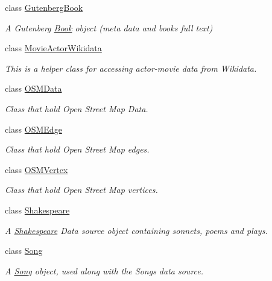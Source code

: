 \begin{DoxyCompactItemize}
class \hyperlink{classbridges_1_1dataset_1_1_gutenberg_book}{Gutenberg\+Book}
\begin{DoxyCompactList}\small\item\em A Gutenberg \hyperlink{classbridges_1_1dataset_1_1_book}{Book} object (meta data and book\textquotesingle{}s full text) \end{DoxyCompactList}\item 
class \hyperlink{classbridges_1_1dataset_1_1_movie_actor_wikidata}{Movie\+Actor\+Wikidata}
\begin{DoxyCompactList}\small\item\em This is a helper class for accessing actor-\/movie data from Wikidata. \end{DoxyCompactList}\item 
class \hyperlink{classbridges_1_1dataset_1_1_o_s_m_data}{O\+S\+M\+Data}
\begin{DoxyCompactList}\small\item\em Class that hold Open Street Map Data. \end{DoxyCompactList}\item 
class \hyperlink{classbridges_1_1dataset_1_1_o_s_m_edge}{O\+S\+M\+Edge}
\begin{DoxyCompactList}\small\item\em Class that hold Open Street Map edges. \end{DoxyCompactList}\item 
class \hyperlink{classbridges_1_1dataset_1_1_o_s_m_vertex}{O\+S\+M\+Vertex}
\begin{DoxyCompactList}\small\item\em Class that hold Open Street Map vertices. \end{DoxyCompactList}\item 
class \hyperlink{classbridges_1_1dataset_1_1_shakespeare}{Shakespeare}
\begin{DoxyCompactList}\small\item\em A \hyperlink{classbridges_1_1dataset_1_1_shakespeare}{Shakespeare} Data source object containing sonnets, poems and plays. \end{DoxyCompactList}\item 
class \hyperlink{classbridges_1_1dataset_1_1_song}{Song}
\begin{DoxyCompactList}\small\item\em A \hyperlink{classbridges_1_1dataset_1_1_song}{Song} object, used along with the Songs data source. \end{DoxyCompactList}\end{DoxyCompactItemize}
